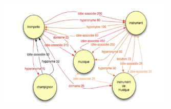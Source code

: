 \documentclass{beamer}
\begin{document}
\begin{frame}
\begin{figure}
  \begin{center}
    \includegraphics[width=0.75\textwidth]{img/jdm.jpeg}
  \end{center}
\end{figure}
\end{frame}
\end{document}
